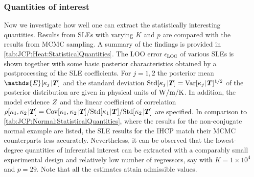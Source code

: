 \subsubsection{Quantities of interest}
Now we investigate how well one can extract the statistically interesting quantities.
Results from SLEs with varying \(K\) and \(p\) are compared with the results from MCMC sampling.
A summary of the findings is provided in \cref{tab:JCP:Heat:StatisticalQuantities}.
The LOO error \(\epsilon_{\mathrm{LOO}}\) of various SLEs is shown together with some basic posterior characteristics obtained by a postprocessing of the SLE coefficients.
For \(j = 1,2\) the posterior mean \(\mathds{E}[\kappa_j \cond \bm{T}]\) and the standard deviation \(\mathrm{Std}[\kappa_j {\:\!}|{\:\!} \bm{T}] = \mathrm{Var}[\kappa_j {\:\!}|{\:\!} \bm{T}]^{1/2}\)
of the posterior distribution are given in physical units of \(\unit[]{W/m/K}\).
In addition, the model evidence \(Z\) and the linear coefficient of correlation
\(\rho[\kappa_1,\kappa_2 \cond \bm{T}] = \mathrm{Cov}[\kappa_1,\kappa_2 \cond \bm{T}] / \mathrm{Std}[\kappa_1 \cond \bm{T}] / \mathrm{Std}[\kappa_2 \cond \bm{T}]\) are specified.
In comparison to \cref{tab:JCP:Normal:StatisticalQuantities}, where the results for the non-conjugate normal example are listed, the SLE results for the IHCP match their MCMC counterparts less accurately.
Nevertheless, it can be observed that the lowest-degree quantities of inferential interest can be extracted with a comparably small experimental design and relatively low number of regressors,
say with \(K = 1 \times 10^4\) and \(p = 29\).
Note that all the estimates attain admissible values.
